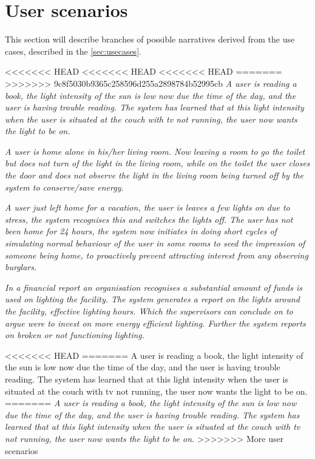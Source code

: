 \section{User scenarios}\label{sec:userscenarious}


This section will describe branches of possible narratives derived from the use cases, described in the \cref{sec:usecases}.

<<<<<<< HEAD
<<<<<<< HEAD
<<<<<<< HEAD
=======
>>>>>>> 9c8f5030b9365c258596d255a2898784b52995cb
\textit{A user is reading a book, the light intensity of the sun is low now due the time of the day, and the user is having trouble reading. The system has learned that at this light intensity when the user is situated at the couch with tv not running, the user now wants the light to be on.}

\textit{A user is home alone in his/her living room. Now leaving a room to go the toilet but does not turn of the light in the living room, while on the toilet the user closes the door and does not observe the light in the living room being turned off by the system to conserve/save energy.}

\textit{A user just left home for a vacation, the user is leaves a few lights on due to stress, the system recognises this and switches the lights off. The user has not been home for 24 hours, the system now initiates in doing short cycles of simulating normal behaviour of the user in some rooms to seed the impression of someone being home, to proactively prevent attracting interest from any observing burglars.}

\textit{In a financial report an organisation recognises a substantial amount of funds is used on lighting the facility. The system generates a report on the lights around the facility, effective lighting hours. Which the supervisors can conclude on to argue were to invest on more energy efficient lighting. Further the system reports on broken or not functioning lighting.}


<<<<<<< HEAD
=======
A user is reading a book, the light intensity of the sun is low now due the time of the day, and the user is having trouble reading. The system has learned that at this light intensity when the user is situated at the couch with tv not running, the user now wants the light to be on.
=======
\textit{A user is reading a book, the light intensity of the sun is low now due the time of the day, and the user is having trouble reading. The system has learned that at this light intensity when the user is situated at the couch with tv not running, the user now wants the light to be on.}
>>>>>>> More user scenarios

